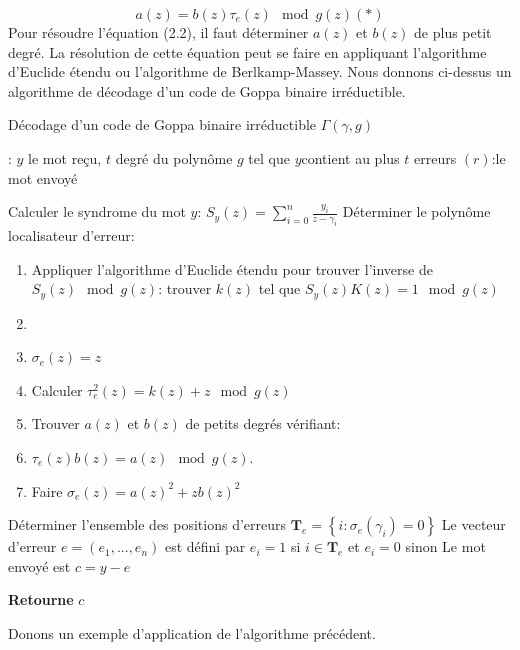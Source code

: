 \documentclass[12pt,openany]{report}
\begin{document}
 \begin{equation}
 a(z)=b(z)\tau_{e}(z) \mod g(z) (*)
 \end{equation}
 Pour résoudre l'équation (2.2), il faut déterminer $a(z)  $ et $b(z)$ de plus petit degré. La résolution de cette équation peut se faire en appliquant l'algorithme d'Euclide étendu ou l'algorithme de Berlkamp-Massey. Nous donnons ci-dessus un algorithme de décodage d'un code de Goppa binaire irréductible.
 \begin{algorithm}
\caption{Décodage d'un code de Goppa binaire irréductible $\Gamma(\gamma,g)$  }\cite{Ndollane}
\label{alg:Goppa}
\begin{algorithmic}[1]
\Require : $y$ le mot reçu, $t$ degré du polynôme $g$ tel que $y$contient au plus $t$ erreurs
\Ensure$(r)$:le mot envoyé

\State Calculer le syndrome du mot $y$: $\mathit{S}_{y}(z)= \sum_{i=0}^{n}\frac{y_i}{z-\gamma_i}$
\State Déterminer le polynôme localisateur d'erreur:
\begin{enumerate}
\item Appliquer l'algorithme d'Euclide étendu pour trouver l'inverse de $\mathit{S}_{y}(z) \mod g(z) $: trouver $ \mathit{k}(z)$ tel que $ \mathit{S}_{y}(z) \mathit{K}(z)= 1 \mod g(z) $
\item {}
\item $ \sigma_e(z)=z  $
 \EndIf
\item Calculer $\tau_{e}^{2}(z)= \mathit{k}(z) +z \mod g(z)  $
\item Trouver $ a(z)$ et $b(z)$ de petits degrés vérifiant:
\item $\tau_{e}(z)b(z)= a(z) \mod g(z)$.
\item Faire $\sigma_{e}(z)= a(z)^{2}+ zb(z)^{2}$
\end{enumerate}
\State Déterminer l'ensemble des positions d'erreurs $\mathbf{T}_{e}=\left\lbrace i : \sigma_{e}(\gamma_i)=0 \right\rbrace  $
\State Le vecteur d'erreur $e=(e_1,...,e_n)$ est défini par $e_i=1  $ si $ i \in \mathbf{T}_{e}$ et $e_i=0$ sinon
\State Le mot envoyé est $c=y-e$
        
 \State \textbf{Retourne} $c$  
 
\end{algorithmic}

\end{algorithm}
 
 Donons un exemple d'application de l'algorithme précédent.\\
 
\end{document}
